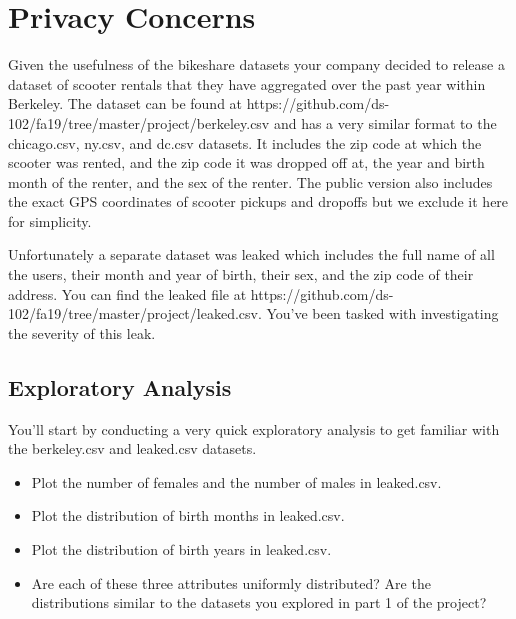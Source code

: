 \documentclass[12pt, answers, addpoints]{exam}
\begin{document}
\section{Privacy Concerns}
Given the usefulness of the bikeshare datasets your company decided to release a dataset of scooter rentals that they have aggregated over the past year within Berkeley. The dataset can be found at https://github.com/ds-102/fa19/tree/master/project/berkeley.csv and has a very similar format to the chicago.csv, ny.csv, and dc.csv datasets. It includes the zip code at which the scooter was rented, and the zip code it was dropped off at, the year and birth month of the renter, and the sex of the renter. The public version also includes the exact GPS coordinates of scooter pickups and dropoffs but we exclude it here for simplicity.

Unfortunately a separate dataset was leaked which includes the full name of all the users, their month and year of birth, their sex, and the zip code of their address. You can find the leaked file at https://github.com/ds-102/fa19/tree/master/project/leaked.csv. You've been tasked with investigating the severity of this leak.

\subsection{Exploratory Analysis}
You'll start by conducting a very quick exploratory analysis to get familiar with the berkeley.csv and leaked.csv datasets.
\begin{itemize}
    \item Plot the number of females and the number of males in leaked.csv.
    \item Plot the distribution of birth months in leaked.csv.
    \item Plot the distribution of birth years in leaked.csv.
    \item Are each of these three attributes uniformly distributed? Are the distributions similar to the datasets you explored in part 1 of the project?
\end{itemize}
\end{document}
